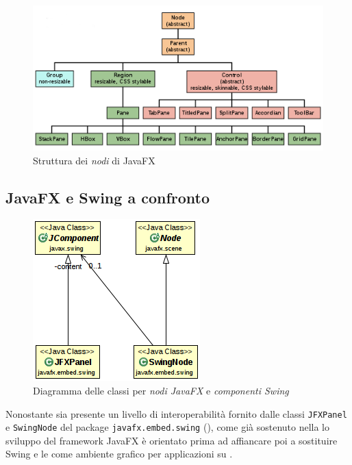            \begin{figure}[htbp]
                \centering
                \includegraphics[scale=0.8]{img/Javafx-layout-classes}
                \caption{Struttura dei \emph{nodi} di JavaFX}
                \label{fig:jfxNode}
            \end{figure}

        \subsection{JavaFX e Swing a confronto}\label{sub:jfxVantaggi}

            \begin{figure}[hbpt]
                \centering
                \includegraphics[scale=0.8]{img/jfxSwingAdapt}
                \caption{Diagramma delle classi  per \emph{nodi JavaFX} e \emph{componenti Swing}}
                \label{fig:jfxSwingAdapt}
            \end{figure}

            Nonostante sia presente un livello di interoperabilità fornito dalle classi  \texttt{JFXPanel} e \texttt{SwingNode} del package \texttt{javafx\dothyp embed\dothyp swing} (), come già sostenuto nella  lo sviluppo del framework JavaFX è orientato prima ad affiancare poi a sostituire Swing e le  come ambiente grafico per applicazioni su .

